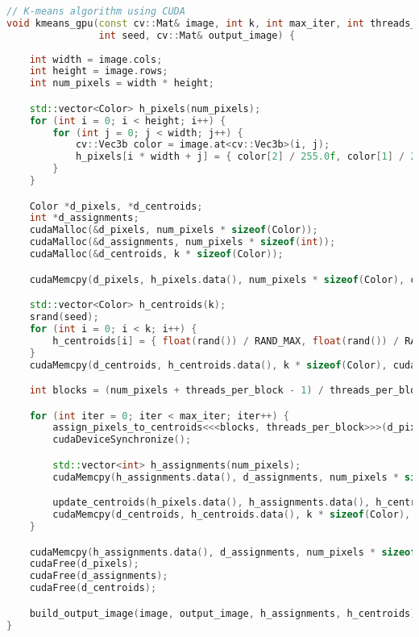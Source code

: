 \begin{lstlisting}[language=C++]
// K-means algorithm using CUDA
void kmeans_gpu(const cv::Mat& image, int k, int max_iter, int threads_per_block, 
                int seed, cv::Mat& output_image) {
    
    int width = image.cols;
    int height = image.rows;
    int num_pixels = width * height;

    std::vector<Color> h_pixels(num_pixels);
    for (int i = 0; i < height; i++) {
        for (int j = 0; j < width; j++) {
            cv::Vec3b color = image.at<cv::Vec3b>(i, j);
            h_pixels[i * width + j] = { color[2] / 255.0f, color[1] / 255.0f, color[0] / 255.0f };
        }
    }

    Color *d_pixels, *d_centroids;
    int *d_assignments;
    cudaMalloc(&d_pixels, num_pixels * sizeof(Color));
    cudaMalloc(&d_assignments, num_pixels * sizeof(int));
    cudaMalloc(&d_centroids, k * sizeof(Color));

    cudaMemcpy(d_pixels, h_pixels.data(), num_pixels * sizeof(Color), cudaMemcpyHostToDevice);

    std::vector<Color> h_centroids(k);
    srand(seed);
    for (int i = 0; i < k; i++) {
        h_centroids[i] = { float(rand()) / RAND_MAX, float(rand()) / RAND_MAX, float(rand()) / RAND_MAX };
    }
    cudaMemcpy(d_centroids, h_centroids.data(), k * sizeof(Color), cudaMemcpyHostToDevice);

    int blocks = (num_pixels + threads_per_block - 1) / threads_per_block;

    for (int iter = 0; iter < max_iter; iter++) {
        assign_pixels_to_centroids<<<blocks, threads_per_block>>>(d_pixels, d_assignments, d_centroids, num_pixels, k);
        cudaDeviceSynchronize();

        std::vector<int> h_assignments(num_pixels);
        cudaMemcpy(h_assignments.data(), d_assignments, num_pixels * sizeof(int), cudaMemcpyDeviceToHost);

        update_centroids(h_pixels.data(), h_assignments.data(), h_centroids.data(), new int[k], num_pixels, k);
        cudaMemcpy(d_centroids, h_centroids.data(), k * sizeof(Color), cudaMemcpyHostToDevice);
    }

    cudaMemcpy(h_assignments.data(), d_assignments, num_pixels * sizeof(int), cudaMemcpyDeviceToHost);
    cudaFree(d_pixels);
    cudaFree(d_assignments);
    cudaFree(d_centroids);

    build_output_image(image, output_image, h_assignments, h_centroids);
}
\end{lstlisting}

